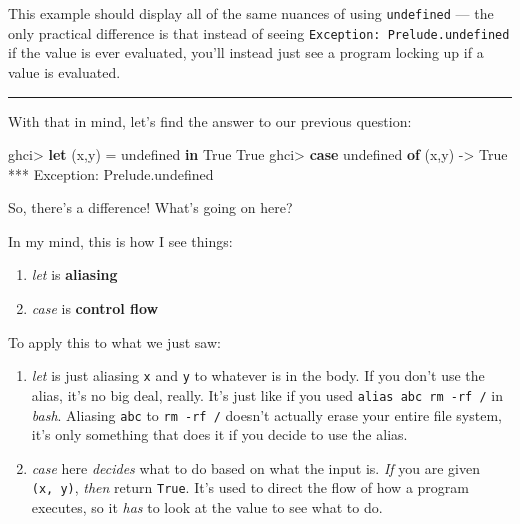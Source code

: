 \documentclass[]{article}
\newenvironment{Shaded}{}{}
\newcommand{\DataTypeTok}[1]{\textcolor[rgb]{0.56,0.13,0.00}{#1}}
\newcommand{\FunctionTok}[1]{\textcolor[rgb]{0.02,0.16,0.49}{#1}}
\newcommand{\KeywordTok}[1]{\textcolor[rgb]{0.00,0.44,0.13}{\textbf{#1}}}
\newcommand{\NormalTok}[1]{#1}
\newcommand{\OperatorTok}[1]{\textcolor[rgb]{0.40,0.40,0.40}{#1}}
\newcommand{\OtherTok}[1]{\textcolor[rgb]{0.00,0.44,0.13}{#1}}
\begin{document}
This example should display all of the same nuances of using \texttt{undefined}
--- the only practical difference is that instead of seeing
\texttt{Exception:\ Prelude.undefined} if the value is ever evaluated, you'll
instead just see a program locking up if a value is evaluated.

\begin{center}\rule{0.5\linewidth}{0.5pt}\end{center}

With that in mind, let's find the answer to our previous question:

\begin{Shaded}
\begin{Highlighting}[]
\NormalTok{ghci}\OperatorTok{\textgreater{}} \KeywordTok{let}\NormalTok{ (x,y) }\OtherTok{=} \FunctionTok{undefined} \KeywordTok{in} \DataTypeTok{True}
\DataTypeTok{True}
\NormalTok{ghci}\OperatorTok{\textgreater{}} \KeywordTok{case} \FunctionTok{undefined} \KeywordTok{of}\NormalTok{ (x,y) }\OtherTok{{-}\textgreater{}} \DataTypeTok{True}
\OperatorTok{***} \DataTypeTok{Exception}\OperatorTok{:}\NormalTok{ Prelude.undefined}
\end{Highlighting}
\end{Shaded}

So, there's a difference! What's going on here?

In my mind, this is how I see things:

\begin{enumerate}
\def\labelenumi{\arabic{enumi}.}
\tightlist
\item
  \emph{let} is \textbf{aliasing}
\item
  \emph{case} is \textbf{control flow}
\end{enumerate}

To apply this to what we just saw:

\begin{enumerate}
\def\labelenumi{\arabic{enumi}.}
\item
  \emph{let} is just aliasing \texttt{x} and \texttt{y} to whatever is in the
  body. If you don't use the alias, it's no big deal, really. It's just like if
  you used \texttt{alias\ abc\ rm\ -rf\ /} in \emph{bash}. Aliasing \texttt{abc}
  to \texttt{rm\ -rf\ /} doesn't actually erase your entire file system, it's
  only something that does it if you decide to use the alias.
\item
  \emph{case} here \emph{decides} what to do based on what the input is.
  \emph{If} you are given \texttt{(x,\ y)}, \emph{then} return \texttt{True}.
  It's used to direct the flow of how a program executes, so it \emph{has} to
  look at the value to see what to do.
\end{enumerate}
\end{document}
